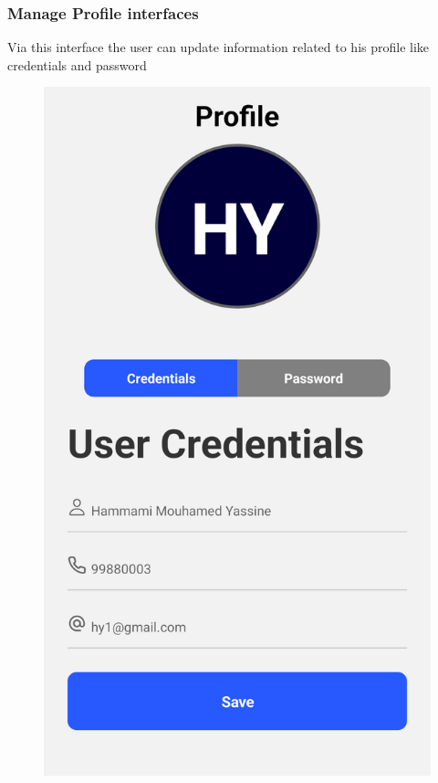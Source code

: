 \subsubsection{Manage Profile interfaces}
Via this interface the user can update information related to his profile like credentials and password
\begin{figure}[H]
\begin{minipage}{0.45\textwidth}
    \centering
    \includegraphics[width=\linewidth]{images/chap2/editUserCred.png}

\end{minipage}
\end{figure}
